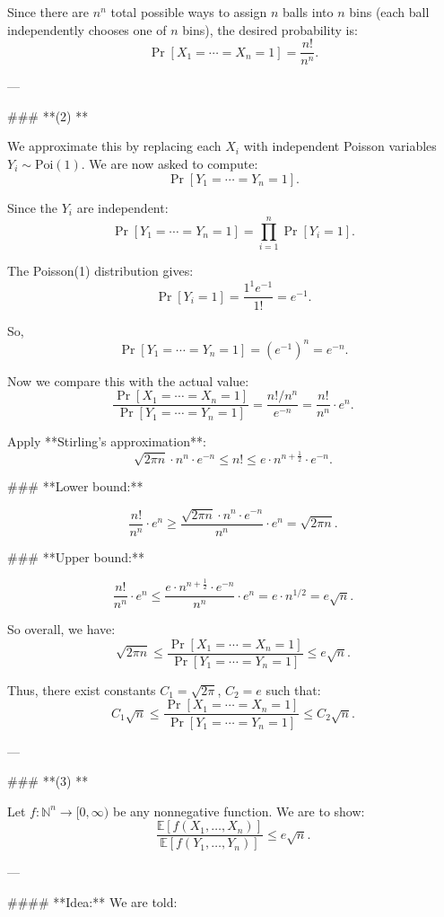 \begin{enumerate}
\begin{shaded}
Since there are \( n^n \) total possible ways to assign \( n \) balls into \( n \) bins (each ball independently chooses one of \( n \) bins), the desired probability is:
\[
\Pr[X_1 = \cdots = X_n = 1] = \frac{n!}{n^n}.
\]

---

### **(2) **

We approximate this by replacing each \( X_i \) with independent Poisson variables \( Y_i \sim \text{Poi}(1) \). We are now asked to compute:
\[
\Pr[Y_1 = \cdots = Y_n = 1].
\]

Since the \( Y_i \) are independent:
\[
\Pr[Y_1 = \cdots = Y_n = 1] = \prod_{i=1}^n \Pr[Y_i = 1].
\]

The Poisson(1) distribution gives:
\[
\Pr[Y_i = 1] = \frac{1^1 e^{-1}}{1!} = e^{-1}.
\]

So,
\[
\Pr[Y_1 = \cdots = Y_n = 1] = (e^{-1})^n = e^{-n}.
\]

Now we compare this with the actual value:
\[
\frac{\Pr[X_1 = \cdots = X_n = 1]}{\Pr[Y_1 = \cdots = Y_n = 1]} = \frac{n! / n^n}{e^{-n}} = \frac{n!}{n^n} \cdot e^n.
\]

Apply **Stirling's approximation**:
\[
\sqrt{2\pi n} \cdot n^n \cdot e^{-n} \le n! \le e \cdot n^{n + \frac{1}{2}} \cdot e^{-n}.
\]

### **Lower bound:**

\[
\frac{n!}{n^n} \cdot e^n \ge \frac{\sqrt{2\pi n} \cdot n^n \cdot e^{-n}}{n^n} \cdot e^n = \sqrt{2\pi n}.
\]

### **Upper bound:**

\[
\frac{n!}{n^n} \cdot e^n \le \frac{e \cdot n^{n+\frac{1}{2}} \cdot e^{-n}}{n^n} \cdot e^n = e \cdot n^{1/2} = e \sqrt{n}.
\]

So overall, we have:
\[
\sqrt{2\pi n} \le \frac{\Pr[X_1 = \cdots = X_n = 1]}{\Pr[Y_1 = \cdots = Y_n = 1]} \le e \sqrt{n}.
\]

Thus, there exist constants \( C_1 = \sqrt{2\pi} \), \( C_2 = e \) such that:
\[
C_1 \sqrt{n} \le \frac{\Pr[X_1 = \cdots = X_n = 1]}{\Pr[Y_1 = \cdots = Y_n = 1]} \le C_2 \sqrt{n}.
\]

---

### **(3) **

Let \( f : \mathbb{N}^n \to [0, \infty) \) be any nonnegative function. We are to show:
\[
\frac{\mathbb{E}[f(X_1, \ldots, X_n)]}{\mathbb{E}[f(Y_1, \ldots, Y_n)]} \le e \sqrt{n}.
\]

---

#### **Idea:**
We are told:


\end{shaded}
\end{enumerate}
